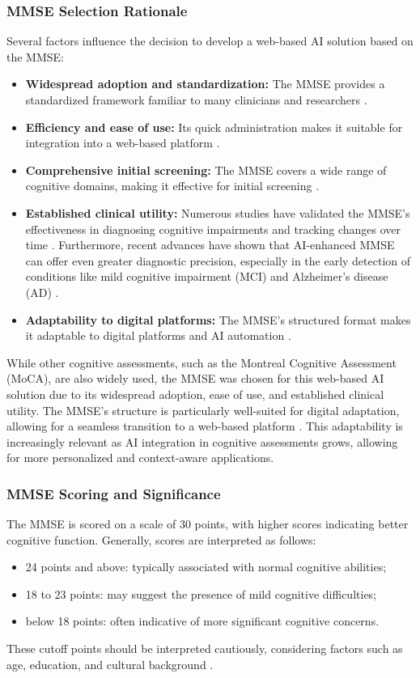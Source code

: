 \subsubsection{MMSE Selection Rationale}
Several factors influence the decision to develop a web-based AI solution based on the MMSE:
\begin{itemize}
\item \textbf{Widespread adoption and standardization:} The MMSE provides a standardized framework familiar to many clinicians and researchers \cite{Folstein1975, Crum1993}.
\item \textbf{Efficiency and ease of use:} Its quick administration makes it suitable for integration into a web-based platform \cite{Tombaugh1992}.
\item \textbf{Comprehensive initial screening:} The MMSE covers a wide range of cognitive domains, making it effective for initial screening \cite{Tombaugh1992}.
\item \textbf{Established clinical utility:} Numerous studies have validated the MMSE's effectiveness in diagnosing cognitive impairments and tracking changes over time \cite{Salmon1990, Mitchell2009}. Furthermore, recent advances have shown that AI-enhanced MMSE can offer even greater diagnostic precision, especially in the early detection of conditions like mild cognitive impairment (MCI) and Alzheimer’s disease (AD) \cite{Formica2023}.
\item \textbf{Adaptability to digital platforms:} The MMSE's structured format makes it adaptable to digital platforms and AI automation \cite{Zygouris2017}.
\end{itemize}

While other cognitive assessments, such as the Montreal Cognitive Assessment (MoCA), are also widely used, the MMSE was chosen for this web-based AI solution due to its widespread adoption, ease of use, and established clinical utility. The MMSE’s structure is particularly well-suited for digital adaptation, allowing for a seamless transition to a web-based platform \cite{Peng2020}. This adaptability is increasingly relevant as AI integration in cognitive assessments grows, allowing for more personalized and context-aware applications.

\subsubsection{MMSE Scoring and Significance}
The MMSE is scored on a scale of 30 points, with higher scores indicating better cognitive function. Generally, scores are interpreted as follows:
\begin{itemize}
\item 24 points and above: typically associated with normal cognitive abilities;
\item 18 to 23 points: may suggest the presence of mild cognitive difficulties;
\item below 18 points: often indicative of more significant cognitive concerns.
\end{itemize}
These cutoff points should be interpreted cautiously, considering factors such as age, education, and cultural background \cite{Kukull1994}.


